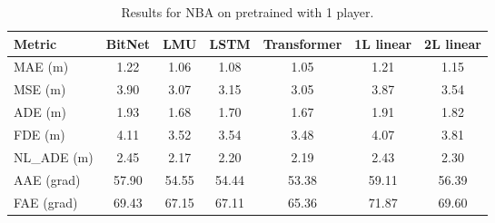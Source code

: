 \begin{table}[H]
\centering
\caption{Results for NBA on pretrained with 1 player.}
\label{pre:NBA}
\begin{tabular}{l||c|c|c|c|c|c}

Metric & BitNet & LMU & LSTM & Transformer & 1L linear & 2L linear \\
\hline\hline
MAE (m) & 1.22 & 1.06 & 1.08 & 1.05 & 1.21 & 1.15 \\
MSE (m) & 3.90 & 3.07 & 3.15 & 3.05 & 3.87 & 3.54 \\
ADE (m) & 1.93 & 1.68 & 1.70 & 1.67 & 1.91 & 1.82 \\
FDE (m) & 4.11 & 3.52 & 3.54 & 3.48 & 4.07 & 3.81 \\
NL\_ADE (m) & 2.45 & 2.17 & 2.20 & 2.19 & 2.43 & 2.30 \\
AAE (grad) & 57.90 & 54.55 & 54.44 & 53.38 & 59.11 & 56.39 \\
FAE (grad) & 69.43 & 67.15 & 67.11 & 65.36 & 71.87 & 69.60 \\
\end{tabular}
\end{table}
